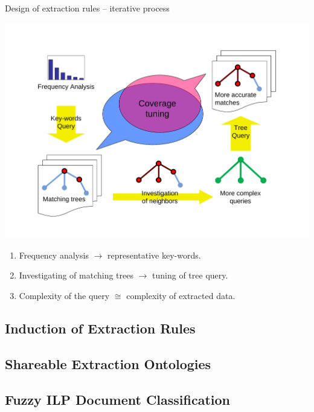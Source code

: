 \documentclass[xcolor=dvipsnames]{beamer}
\begin{document}
\begin{frame}{Design of extraction rules -- iterative process}
\begin{center}
\includegraphics[height=0.8\vsize, angle=-90]{img/coverge_tuning}
\end{center}
\begin{enumerate}
	\item \alert{Frequency analysis} $\rightarrow$ representative key-words.
	\item Investigating of matching trees $\rightarrow$ \alert{tuning} of tree query.
	\item \alert{Complexity} of the query $\cong$ complexity of extracted data.
\end{enumerate}
\end{frame}



\subsection{Induction of Extraction Rules}

\subsection{Shareable Extraction Ontologies}

\subsection{Fuzzy ILP Document Classification}
\end{document}
